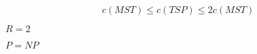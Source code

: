 \documentclass[10pt]{book}
\begin{document}
\begin{mdSnippets}
\begin{mdDisplaySnippet}[20657d5291fd79b369fa7d45cfa0876f]
\[\]%
\end{mdDisplaySnippet}%
\begin{mdDisplaySnippet}%
\[%
c(MST) \le c(TSP) \le 2c(MST)
\]%
\end{mdDisplaySnippet}%
\begin{mdInlineSnippet}[b09c6f646b1383ec048b47d563da6de2]%
$R=2$\end{mdInlineSnippet}%
\begin{mdInlineSnippet}%
$P = NP$\end{mdInlineSnippet}%

\end{mdSnippets}
\end{document}
